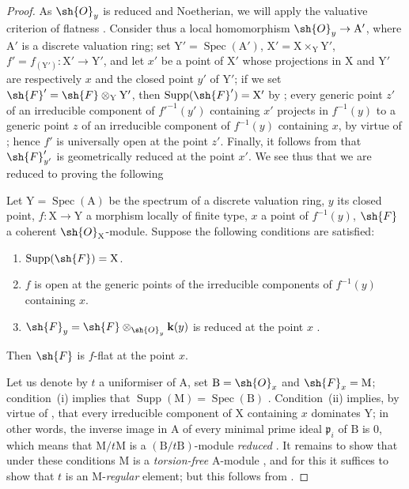 \begin{proof}
\label{IV.15.2.2-proof}
As $\sh{O}_y$ is reduced and Noetherian, we will apply the valuative criterion of flatness .
Consider thus a local homomorphism $\sh{O}_y\to\mathrm{A}'$, where $\mathrm{A}'$ is a discrete valuation ring; set $\mathrm{Y}'=\operatorname{Spec}(\mathrm{A}')$, $\mathrm{X}'=\mathrm{X}\times_\mathrm{Y}\mathrm{Y}'$, $f'=f_{(\mathrm{Y}')}:\mathrm{X}'\to\mathrm{Y}'$, and let $x'$ be a point of $\mathrm{X}'$ whose projections in $\mathrm{X}$ and $\mathrm{Y}'$ are respectively $x$ and the closed point $y'$ of $\mathrm{Y}'$; if we set $\sh{F}'=\sh{F}\otimes_\mathrm{Y}\mathrm{Y}'$, then $\operatorname{Supp}(\sh{F}')=\mathrm{X}'$ by ; every generic point $z'$ of an irreducible component of $f'^{-1}(y')$ containing $x'$ projects in $f^{-1}(y)$ to a generic point $z$ of an irreducible component of $f^{-1}(y)$ containing $x$, by virtue of ; hence $f'$ is universally open at the point $z'$.
Finally, it follows from  that $\sh{F}_{y'}'$ is geometrically reduced at the point $x'$.
We see thus that we are reduced to proving the following

\begin{lemma}[15.2.2.1]
\label{IV.15.2.2.1}
Let $\mathrm{Y}=\operatorname{Spec}(\mathrm{A})$ be the spectrum of a discrete valuation ring, $y$ its closed point, $f:\mathrm{X}\to\mathrm{Y}$ a morphism locally of finite type, $x$ a point of $f^{-1}(y)$, $\sh{F}$ a coherent $\sh{O}_\mathrm{X}$-module.
Suppose the following conditions are satisfied:
\begin{enumerate}[label=(\roman*)]
  \item $\operatorname{Supp}(\sh{F})=\mathrm{X}$.
  \item $f$ is open at the generic points of the irreducible components of $f^{-1}(y)$ containing $x$.
  \item $\sh{F}_y=\sh{F}\otimes_{\sh{O}_y}\mathbf{k}(y)$ is reduced at the point $x$ .
\end{enumerate}
Then $\sh{F}$ is $f$-flat at the point $x$.
\end{lemma}

Let us denote by $t$ a uniformiser of $\mathrm{A}$, set $\mathrm{B}=\sh{O}_x$ and $\sh{F}_x=\mathrm{M}$; condition~(i) implies that $\operatorname{Supp}(\mathrm{M})=\operatorname{Spec}(\mathrm{B})$ .
Condition~(ii) implies, by virtue of , that every irreducible component of $\mathrm{X}$ containing $x$ dominates $\mathrm{Y}$; in other words, the inverse image in $\mathrm{A}$ of every minimal prime ideal $\mathfrak{p}_i$ of $\mathrm{B}$ is $0$, which means that $\mathrm{M}/t\mathrm{M}$ is a $(\mathrm{B}/t\mathrm{B})$-module \emph{reduced} .
It remains to show that under these conditions $\mathrm{M}$ is a \emph{torsion-free} $\mathrm{A}$-module , and for this it suffices to show that $t$ is an $\mathrm{M}$-\emph{regular} element; but this follows from .
\end{proof}

